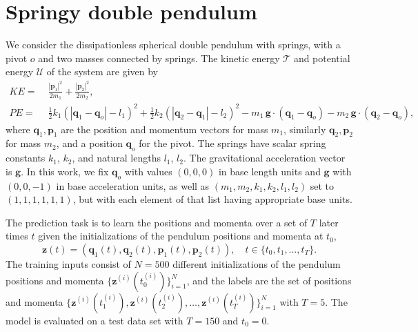 \documentclass{article}
\theoremstyle{plain}
\theoremstyle{definition}
\theoremstyle{remark}
\begin{document}

{\raggedright


}

\appendix\onecolumn
\section{Springy double pendulum}\label{app:pendulum}
We consider the dissipationless spherical double pendulum with springs, with a pivot $o$ and two masses connected by springs. The kinetic energy $\mathcal{T}$ and potential energy $\mathcal{U}$ of the system are given by
\begin{align}
    KE =&\;\frac{|\mathbf{p}_1|^2}{2m_1} +\frac{|\mathbf{p}_2|^2}{2m_2}, \label{eq:energy_T}\\
    PE =&\;\frac12 k_1(|\mathbf{q}_1-\mathbf{q}_o|-l_1)^2 + \frac12 k_2(|\mathbf{q}_2-\mathbf{q}_1|-l_2)^2 
    -m_1\,\mathbf{g}\cdot (\mathbf{q}_1-\mathbf{q}_o)- m_2 \,\mathbf{g}\cdot  (\mathbf{q}_2-\mathbf{q}_o), \label{eq:energy_U}
\end{align}
where $\mathbf{q}_1, \mathbf{p}_1$ are the position and momentum vectors for mass $m_1$, similarly $\mathbf{q}_2, \mathbf{p}_2$ for mass $m_2$, and a position $\mathbf{q}_o$ for the pivot. The springs have scalar spring constants $k_1$, $k_2$, and natural lengths $l_1$, $l_2$. The gravitational acceleration vector is $\mathbf{g}$. 
In this work, we fix $\mathbf{q}_o$ with values $(0,0,0)$ in base length units and $\mathbf{g}$ with $(0,0,-1)$ in base acceleration units, as well as $(m_1, m_2, k_1, k_2, l_1, l_2)$ set to $(1,1,1,1,1,1)$, but with each element of that list having appropriate base units. 

The prediction task is to learn the positions and momenta over a set of $T$ later times $t$ given the initializations of the pendulum positions and momenta at $t_0$,
\begin{equation}
\mathbf{z}(t)=(\mathbf{q}_1(t),\mathbf{q}_2(t),\mathbf{p}_1(t),\mathbf{p}_2(t)), \quad t\in\{t_0, t_1,\ldots,t_T\}. 
\end{equation}
The training inputs consist of $N=500$ different initializations of the pendulum positions and momenta $\{\mathbf{z}^{(i)}(t_0^{(i)})\}_{i=1}^N$, and the labels are the set of positions and momenta $\{\mathbf{z}^{(i)}(t_1^{(i)}),\mathbf{z}^{(i)}(t_2^{(i)}),\ldots,\mathbf{z}^{(i)}(t_T^{(i)})\}_{i=1}^N$ with $T=5$.
The model is evaluated on a test data set with $T=150$ and $t_0=0$. 
\end{document}
